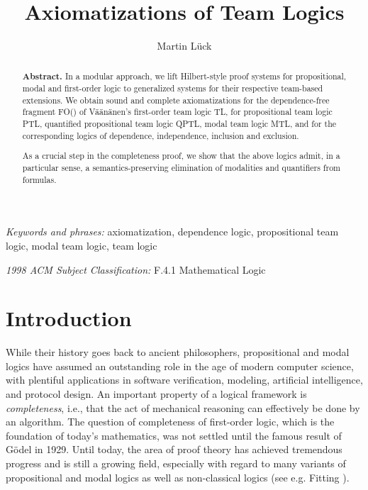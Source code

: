 \documentclass[a4paper,english,fleqn,11pt,final]{scrartcl}
\title{Axiomatizations of Team Logics}
\author{Martin Lück}
\date{\vspace{-5ex}}
\affil{\small{}Leibniz Universität Hannover, Institut für Theoretische Informatik,\\
Appelstraße 4, 30167 Hannover, Germany\\\texttt{lueck@thi.uni-hannover.de}}
\makeatletter
\newcommand{\ie}{i.e.\@\xspace}
\newcommand{\eg}{e.g.\@\xspace}
\theoremstyle{plain}
\theoremstyle{definition}
\makeatother
\begin{document}
\maketitle

\begin{abstract}
\textbf{Abstract.}
In a modular approach, we lift Hilbert-style proof systems for propositional, modal and first-order logic to generalized systems for their respective team-based extensions.
We obtain sound and complete axiomatizations for the dependence-free fragment FO() of Väänänen's first-order team logic TL, for propositional team logic PTL, quantified propositional team logic QPTL, modal team logic MTL, and for the corresponding logics of dependence, independence, inclusion and exclusion.

As a crucial step in the completeness proof, we show that the above logics admit, in a particular sense, a semantics-preserving elimination of modalities and quantifiers from formulas.
\end{abstract}

\noindent\textit{Keywords and phrases:} axiomatization, dependence logic, propositional team logic, modal team logic, team logic

\noindent\textit{1998 ACM Subject Classification:} F.4.1 Mathematical Logic


\section{Introduction}

While their history goes back to ancient philosophers, propositional and modal logics have assumed an outstanding role in the age of modern computer science, with plentiful applications in software verification, modeling, artificial intelligence, and protocol design.
An important property of a logical framework is \emph{completeness}, \ie, that the act of mechanical reasoning can effectively be done by an algorithm.
The question of completeness of first-order logic, which is the foundation of today's mathematics, was not settled until the famous result of Gödel in 1929.
Until today, the area of proof theory has achieved tremendous progress and is still a growing field, especially with regard to many variants of propositional and modal logics as well as non-classical logics (see \eg Fitting \cite{fitting_proof_1983}).

\smallskip
\end{document}
